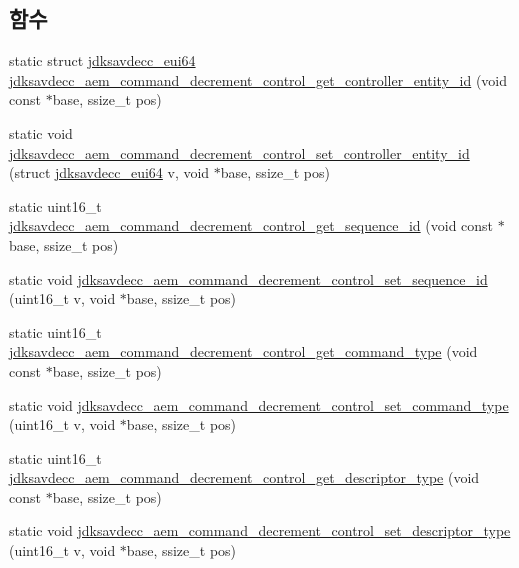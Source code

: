 \subsection*{함수}
\begin{DoxyCompactItemize}
\item 
static struct \hyperlink{structjdksavdecc__eui64}{jdksavdecc\+\_\+eui64} \hyperlink{group__command__decrement__control_gae93927152b38159e4b1d74ba20449efd}{jdksavdecc\+\_\+aem\+\_\+command\+\_\+decrement\+\_\+control\+\_\+get\+\_\+controller\+\_\+entity\+\_\+id} (void const $\ast$base, ssize\+\_\+t pos)
\item 
static void \hyperlink{group__command__decrement__control_ga6ae67f3b51b3d4a97b5aa1ed3fb6f944}{jdksavdecc\+\_\+aem\+\_\+command\+\_\+decrement\+\_\+control\+\_\+set\+\_\+controller\+\_\+entity\+\_\+id} (struct \hyperlink{structjdksavdecc__eui64}{jdksavdecc\+\_\+eui64} v, void $\ast$base, ssize\+\_\+t pos)
\item 
static uint16\+\_\+t \hyperlink{group__command__decrement__control_ga9445e0461c32b7e84dde4f217ea203f4}{jdksavdecc\+\_\+aem\+\_\+command\+\_\+decrement\+\_\+control\+\_\+get\+\_\+sequence\+\_\+id} (void const $\ast$base, ssize\+\_\+t pos)
\item 
static void \hyperlink{group__command__decrement__control_gad771d5431a9d2f8161f15e40b34c4035}{jdksavdecc\+\_\+aem\+\_\+command\+\_\+decrement\+\_\+control\+\_\+set\+\_\+sequence\+\_\+id} (uint16\+\_\+t v, void $\ast$base, ssize\+\_\+t pos)
\item 
static uint16\+\_\+t \hyperlink{group__command__decrement__control_ga5bbb280412a519110822c258f92b0d78}{jdksavdecc\+\_\+aem\+\_\+command\+\_\+decrement\+\_\+control\+\_\+get\+\_\+command\+\_\+type} (void const $\ast$base, ssize\+\_\+t pos)
\item 
static void \hyperlink{group__command__decrement__control_gadfaf8dd3bc6c19d8d81f78477fa447fb}{jdksavdecc\+\_\+aem\+\_\+command\+\_\+decrement\+\_\+control\+\_\+set\+\_\+command\+\_\+type} (uint16\+\_\+t v, void $\ast$base, ssize\+\_\+t pos)
\item 
static uint16\+\_\+t \hyperlink{group__command__decrement__control_gae4b568d85c7721e6508c43314ec5e321}{jdksavdecc\+\_\+aem\+\_\+command\+\_\+decrement\+\_\+control\+\_\+get\+\_\+descriptor\+\_\+type} (void const $\ast$base, ssize\+\_\+t pos)
\item 
static void \hyperlink{group__command__decrement__control_ga502836f18f725b14b742dd7f45d6bba6}{jdksavdecc\+\_\+aem\+\_\+command\+\_\+decrement\+\_\+control\+\_\+set\+\_\+descriptor\+\_\+type} (uint16\+\_\+t v, void $\ast$base, ssize\+\_\+t pos)

\end{DoxyCompactItemize}

